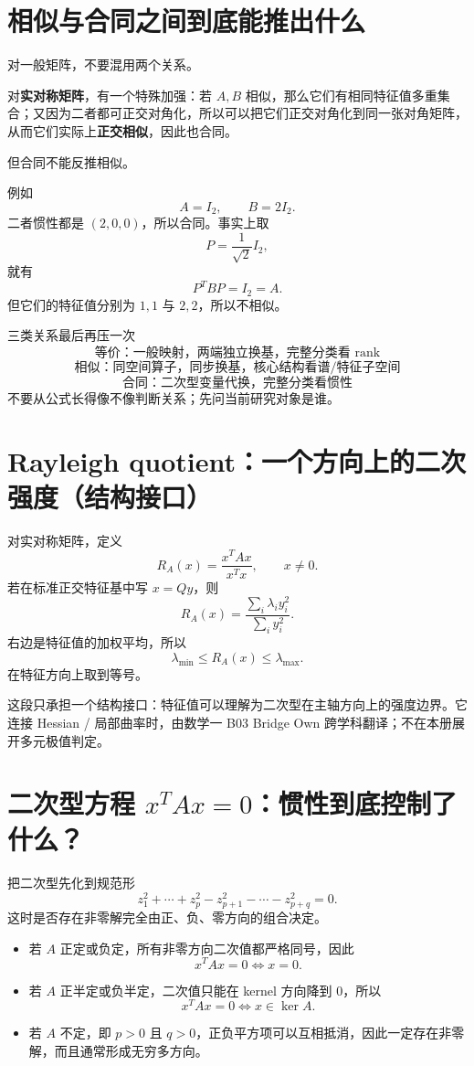 \documentclass[11pt,a4paper]{ctexart}
\newcommand{\kw}[1]{\textbf{\color{deep}#1}}
\begin{document}
\section{相似与合同之间到底能推出什么}

对一般矩阵，不要混用两个关系。

对\kw{实对称矩阵}，有一个特殊加强：若 $A,B$ 相似，那么它们有相同特征值多重集合；又因为二者都可正交对角化，所以可以把它们正交对角化到同一张对角矩阵，从而它们实际上\kw{正交相似}，因此也合同。

但合同不能反推相似。

例如
\[
A=I_2,
\qquad B=2I_2.
\]
二者惯性都是 $(2,0,0)$，所以合同。事实上取
\[
P=\frac1{\sqrt2}I_2,
\]
就有
\[
P^TBP=I_2=A.
\]
但它们的特征值分别为 $1,1$ 与 $2,2$，所以不相似。

\begin{corebox}{三类关系最后再压一次}
\[
\boxed{\text{等价：一般映射，两端独立换基，完整分类看 rank}}
\]
\[
\boxed{\text{相似：同空间算子，同步换基，核心结构看谱/特征子空间}}
\]
\[
\boxed{\text{合同：二次型变量代换，完整分类看惯性}}
\]
不要从公式长得像不像判断关系；先问当前研究对象是谁。
\end{corebox}

\section{Rayleigh quotient：一个方向上的二次强度（结构接口）}

对实对称矩阵，定义
\[
R_A(x)=\frac{x^TAx}{x^Tx},
\qquad x\neq0.
\]
若在标准正交特征基中写 $x=Qy$，则
\[
R_A(x)=
\frac{\sum_i\lambda_i y_i^2}{\sum_i y_i^2}.
\]
右边是特征值的加权平均，所以
\[
\boxed{
\lambda_{\min}\le R_A(x)\le\lambda_{\max}.
}
\]
在特征方向上取到等号。

这段只承担一个结构接口：特征值可以理解为二次型在主轴方向上的强度边界。它连接 Hessian / 局部曲率时，由数学一 B03 Bridge Own 跨学科翻译；不在本册展开多元极值判定。

\section{二次型方程 $x^TAx=0$：惯性到底控制了什么？}

把二次型先化到规范形
\[
z_1^2+\cdots+z_p^2
-z_{p+1}^2-\cdots-z_{p+q}^2=0.
\]
这时是否存在非零解完全由正、负、零方向的组合决定。

\begin{itemize}
  \item 若 $A$ 正定或负定，所有非零方向二次值都严格同号，因此
  \[
  x^TAx=0\iff x=0.
  \]
  \item 若 $A$ 正半定或负半定，二次值只能在 kernel 方向降到 $0$，所以
  \[
  \boxed{x^TAx=0\iff x\in\ker A.}
  \]
  \item 若 $A$ 不定，即 $p>0$ 且 $q>0$，正负平方项可以互相抵消，因此一定存在非零解，而且通常形成无穷多方向。
\end{itemize}
\end{document}
